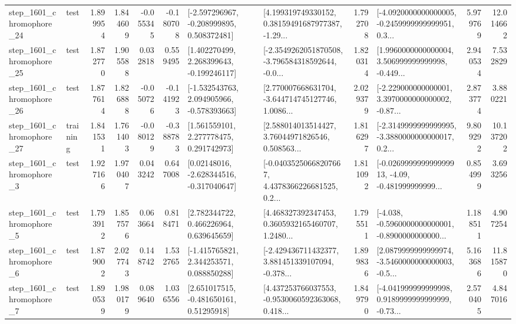 \begin{tabular}{llrrrrllrlrr}
 step\_1601\_chromophore\_24 &      test &      1.899954 &    1.844609 &     -0.055345 & -0.180708 &   [-2.597296967, -0.208999895, 0.508372481] &  [4.199319749330152, 0.38159491687977387, -1.29... &       1.792708 &  [-4.0920000000000005, -0.2459999999999951, 0.3... &            5.979769 &         12.014662 \\
 step\_1601\_chromophore\_25 &      test &      1.872770 &    1.905588 &      0.032818 &  0.559495 &    [1.402270499, 2.268399643, -0.199246117] &  [-2.3549262051870508, -3.796584318592644, -0.0... &       1.820314 &  [1.9960000000000004, 3.506999999999998, -0.449... &            2.940534 &          7.532829 \\
 step\_1601\_chromophore\_26 &      test &      1.877614 &    1.826888 &     -0.050726 & -0.141923 &   [-1.532543763, 2.094905966, -0.578393663] &  [2.770007668631704, -3.644714745127746, 1.0086... &       2.029379 &  [-2.229000000000001, 3.3970000000000002, -0.87... &            2.873774 &          3.880221 \\
 step\_1601\_chromophore\_27 &  training &      1.841531 &    1.761403 &     -0.080129 & -0.388783 &     [1.561559101, 2.277778475, 0.291742973] &  [2.588014013514427, 3.76044971826546, 0.508563... &       1.816297 &  [-2.3149999999999995, -3.3880000000000017, 0.2... &            9.809292 &         10.137202 \\
  step\_1601\_chromophore\_3 &      test &      1.927166 &    1.970407 &      0.043242 &  0.647008 &    [0.02148016, -2.628344516, -0.317040647] &  [-0.04035250668207667, 4.4378366226681525, 0.2... &       1.811092 &  [-0.026999999999999913, -4.09, -0.481999999999... &            0.854999 &          3.693256 \\
  step\_1601\_chromophore\_5 &      test &      1.793912 &    1.857576 &      0.063664 &  0.818471 &     [2.782344722, 0.466226964, 0.639645659] &  [4.468327392347453, 0.3605932165460707, 1.2480... &       1.795511 &  [-4.038, -0.5960000000000001, -0.8900000000000... &            1.188511 &          4.907254 \\
  step\_1601\_chromophore\_6 &      test &      1.879002 &    2.027743 &      0.148742 &  1.532765 &    [-1.415765821, 2.344253571, 0.088850288] &  [-2.429436711432377, 3.881451339107094, -0.378... &       1.899836 &  [2.0879999999999974, -3.5460000000000003, -0.5... &            5.163686 &         11.815870 \\
  step\_1601\_chromophore\_7 &      test &      1.890539 &    1.980179 &      0.089640 &  1.036556 &     [2.651017515, -0.481650161, 0.51295918] &  [4.437253766037553, -0.9530060592363068, 0.418... &       1.849790 &  [-4.041999999999998, 0.9189999999999999, -0.73... &            2.570405 &          4.847016 \\

\end{tabular}
